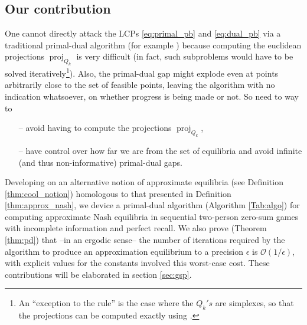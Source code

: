 \documentclass{article} %
\DeclareMathOperator{\proj}{proj}
\begin{document}

\subsection{Our contribution}
One cannot directly attack the LCPs \eqref{eq:primal_pb} and
\eqref{eq:dual_pb} via a traditional primal-dual algorithm
(for example \cite{chambolle2010,chambolle2014ergodic}) because
computing the euclidean projections $\proj_{Q_k}$ is very difficult
(in fact, such subproblems would have to be solved
iteratively\footnote{An ``exception to the rule'' is the case where
  the $Q_k's$ are simplexes, so that the projections can be computed
  exactly using \cite{duchi2008efficient}.}). Also,
the primal-dual gap might explode even at points arbitrarily close to
the set of feasible points, leaving the algorithm with no indication
whatsoever, on whether progress is being made or not. So need to way to
\begin{itemize}
\item[--] avoid having to compute the projections $\proj_{Q_k}$,
\item[--] have control over how far we are from the set of equilibria and
  avoid infinite (and thus non-informative) primal-dual gaps.
\end{itemize}

Developing on an alternative notion of approximate equilibria (see
Definition \ref{thm:cool_notion})
homologous to that presented in Definition \ref{thm:approx_nash}, we
device a primal-dual algorithm (Algorithm \ref{Tab:algo}) for
computing approximate Nash equilibria in sequential two-person
zero-sum games with incomplete information and perfect recall. We also
prove (Theorem \ref{thm:pd}) that --in an ergodic sense-- the number of
iterations required by the algorithm to produce an approximation
equilibrium to a precision $\epsilon$ is $\mathcal{O}(1/\epsilon)$,
with explicit values for the constants involved this worst-case cost.
These contributions will be elaborated in section \ref{sec:gsp}.
\end{document}
